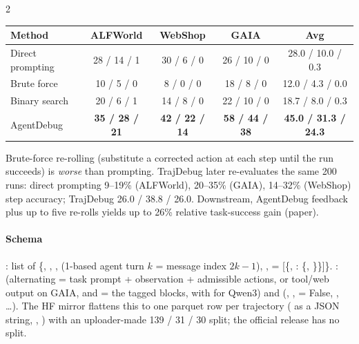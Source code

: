 \begin{multicols}{2}
\begin{center}\footnotesize\setlength{\tabcolsep}{2.5pt}
\begin{tabular}{@{}lcccc@{}}\toprule
Method & ALFWorld & WebShop & GAIA & Avg\\\midrule
Direct prompting & 28 / 14 / 1 & 30 / 6 / 0 & 26 / 10 / 0 & 28.0 / 10.0 / 0.3\\
Brute force & 10 / 5 / 0 & 8 / 0 / 0 & 18 / 8 / 0 & 12.0 / 4.3 / 0.0\\
Binary search & 20 / 6 / 1 & 14 / 8 / 0 & 22 / 10 / 0 & 18.7 / 8.0 / 0.3\\
AgentDebug & \textbf{35 / 28 / 21} & \textbf{42 / 22 / 14} & \textbf{58 / 44 / 38} & \textbf{45.0 / 31.3 / 24.3}\\\bottomrule
\end{tabular}
\end{center}
Brute-force re-rolling (substitute a corrected action at each step until the run succeeds) is \emph{worse} than prompting. TrajDebug later re-evaluates the same 200 runs: direct prompting 9--19\% (ALFWorld), 20--35\% (GAIA), 14--32\% (WebShop) step accuracy; TrajDebug 26.0 / 38.8 / 26.0. Downstream, AgentDebug feedback plus up to five re-rolls yields up to 26\% relative task-success gain (paper).

\paragraph{Schema} : list of \{, , ,  (1-based agent turn $k$ = message index $2k{-}1$), ,  = [\{, : \{, \}\}]\}. :  (alternating  = task prompt + observation + admissible actions, or tool/web output on GAIA, and  = the tagged blocks, with  for Qwen3) and  (, ,  = False, , \dots). The HF mirror flattens this to one parquet row per trajectory ( as a JSON string, , ) with an uploader-made 139 / 31 / 30 split; the official release has no split.
\end{multicols}

